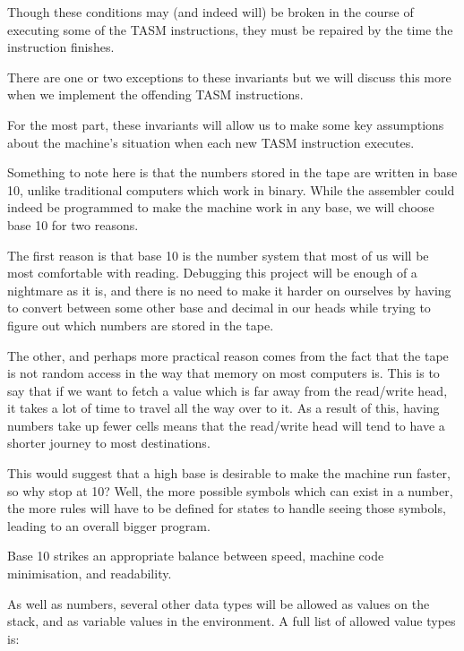Though these conditions may (and indeed will) be broken in the course of executing some of the TASM instructions, they must be repaired by the time the instruction finishes.

There are one or two exceptions to these invariants but we will discuss this more when we implement the offending TASM instructions.

For the most part, these invariants will allow us to make some key assumptions about the machine's situation when each new TASM instruction executes.

Something to note here is that the numbers stored in the tape are written in base 10, unlike traditional computers which work in binary. While the assembler could indeed be programmed to make the machine work in any base, we will choose base 10 for two reasons.

The first reason is that base 10 is the number system that most of us will be most comfortable with reading. Debugging this project will be enough of a nightmare as it is, and there is no need to make it harder on ourselves by having to convert between some other base and decimal in our heads while trying to figure out which numbers are stored in the tape.

The other, and perhaps more practical reason comes from the fact that the tape is not random access in the way that memory on most computers is. This is to say that if we want to fetch a value which is far away from the read/write head, it takes a lot of time to travel all the way over to it. As a result of this, having numbers take up fewer cells means that the read/write head will tend to have a shorter journey to most destinations.

This would suggest that a high base is desirable to make the machine run faster, so why stop at 10? Well, the more possible symbols which can exist in a number, the more rules will have to be defined for states to handle seeing those symbols, leading to an overall bigger program.

Base 10 strikes an appropriate balance between speed, machine code minimisation, and readability.

As well as numbers, several other data types will be allowed as values on the stack, and as variable values in the environment. A full list of allowed value types is:

